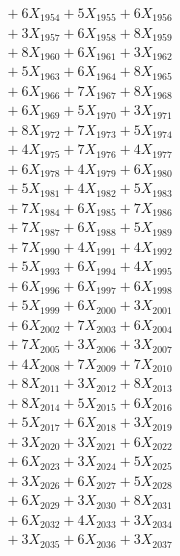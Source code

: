 \documentclass[a4paper,10pt]{article}
\begin{document}
{\begin{align}
&\;  + 6 X_{1954} + 5 X_{1955} + 6 X_{1956} \\[0.3ex]
&\;  + 3 X_{1957} + 6 X_{1958} + 8 X_{1959} \\[0.5ex]\allowbreak
&\;  + 8 X_{1960} + 6 X_{1961} + 3 X_{1962} \\[0.3ex]
&\;  + 5 X_{1963} + 6 X_{1964} + 8 X_{1965} \\[0.3ex]
&\;  + 6 X_{1966} + 7 X_{1967} + 8 X_{1968} \\[0.3ex]
&\;  + 6 X_{1969} + 5 X_{1970} + 3 X_{1971} \\[0.3ex]
&\;  + 8 X_{1972} + 7 X_{1973} + 5 X_{1974} \\[0.3ex]
&\;  + 4 X_{1975} + 7 X_{1976} + 4 X_{1977} \\[0.3ex]
&\;  + 6 X_{1978} + 4 X_{1979} + 6 X_{1980} \\[0.3ex]
&\;  + 5 X_{1981} + 4 X_{1982} + 5 X_{1983} \\[0.3ex]
&\;  + 7 X_{1984} + 6 X_{1985} + 7 X_{1986} \\[0.3ex]
&\;  + 7 X_{1987} + 6 X_{1988} + 5 X_{1989} \\[0.5ex]\allowbreak
&\;  + 7 X_{1990} + 4 X_{1991} + 4 X_{1992} \\[0.3ex]
&\;  + 5 X_{1993} + 6 X_{1994} + 4 X_{1995} \\[0.3ex]
&\;  + 6 X_{1996} + 6 X_{1997} + 6 X_{1998} \\[0.3ex]
&\;  + 5 X_{1999} + 6 X_{2000} + 3 X_{2001} \\[0.3ex]
&\;  + 6 X_{2002} + 7 X_{2003} + 6 X_{2004} \\[0.3ex]
&\;  + 7 X_{2005} + 3 X_{2006} + 3 X_{2007} \\[0.3ex]
&\;  + 4 X_{2008} + 7 X_{2009} + 7 X_{2010} \\[0.3ex]
&\;  + 8 X_{2011} + 3 X_{2012} + 8 X_{2013} \\[0.3ex]
&\;  + 8 X_{2014} + 5 X_{2015} + 6 X_{2016} \\[0.3ex]
&\;  + 5 X_{2017} + 6 X_{2018} + 3 X_{2019} \\[0.5ex]\allowbreak
&\;  + 3 X_{2020} + 3 X_{2021} + 6 X_{2022} \\[0.3ex]
&\;  + 6 X_{2023} + 3 X_{2024} + 5 X_{2025} \\[0.3ex]
&\;  + 3 X_{2026} + 6 X_{2027} + 5 X_{2028} \\[0.3ex]
&\;  + 6 X_{2029} + 3 X_{2030} + 8 X_{2031} \\[0.3ex]
&\;  + 6 X_{2032} + 4 X_{2033} + 3 X_{2034} \\[0.3ex]
&\;  + 3 X_{2035} + 6 X_{2036} + 3 X_{2037} \\[0.3ex]

\end{align}}
\end{document}
